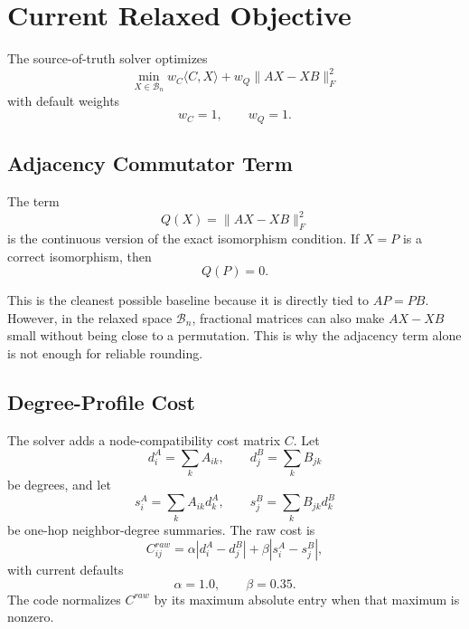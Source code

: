 \documentclass[11pt]{article}
\begin{document}
\section{Current Relaxed Objective}

The source-of-truth solver optimizes
\begin{equation}
\boxed{
    \min_{X\in\mathcal{B}_n}
    w_C\langle C,X\rangle
    +
    w_Q\|AX-XB\|_F^2
}
\label{eq:objective}
\end{equation}
with default weights
\begin{equation}
    w_C=1,\qquad w_Q=1.
\end{equation}

\subsection{Adjacency Commutator Term}

The term
\begin{equation}
    Q(X)=\|AX-XB\|_F^2
\end{equation}
is the continuous version of the exact isomorphism condition.
If $X=P$ is a correct isomorphism, then
\begin{equation}
    Q(P)=0.
\end{equation}

This is the cleanest possible baseline because it is directly tied to
$AP=PB$.
However, in the relaxed space $\mathcal{B}_n$, fractional matrices can also
make $AX-XB$ small without being close to a permutation.
This is why the adjacency term alone is not enough for reliable rounding.

\subsection{Degree-Profile Cost}

The solver adds a node-compatibility cost matrix $C$.
Let
\begin{equation}
    d^A_i=\sum_k A_{ik},\qquad d^B_j=\sum_k B_{jk}
\end{equation}
be degrees, and let
\begin{equation}
    s^A_i=\sum_k A_{ik}d^A_k,\qquad
    s^B_j=\sum_k B_{jk}d^B_k
\end{equation}
be one-hop neighbor-degree summaries.
The raw cost is
\begin{equation}
    C^{raw}_{ij}
    =
    \alpha |d^A_i-d^B_j|
    +
    \beta |s^A_i-s^B_j|,
\end{equation}
with current defaults
\begin{equation}
    \alpha=1.0,\qquad \beta=0.35.
\end{equation}
The code normalizes $C^{raw}$ by its maximum absolute entry when that maximum
is nonzero.
\end{document}
